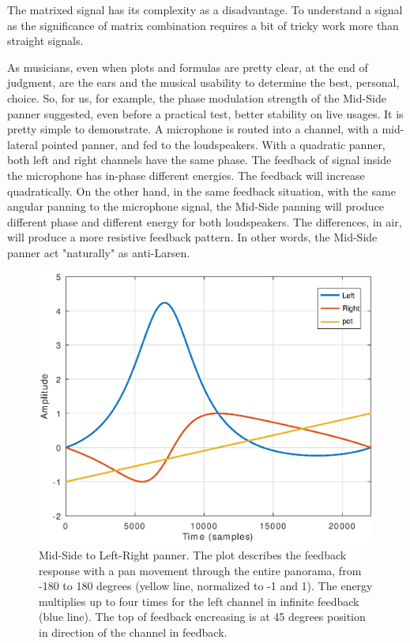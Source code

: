 \documentclass{article}
\begin{document}
The matrixed signal has its complexity as a disadvantage. To understand a signal as the significance of matrix combination requires a bit of tricky work more than straight signals. 

As musicians, even when plots and formulas are pretty clear, at the end of judgment, are the ears and the musical usability to determine the best, personal, choice. So, for us, for example, the phase modulation strength of the Mid-Side panner suggested, even before a practical test, better stability on live usages. It is pretty simple to demonstrate. A microphone is routed into a channel, with a mid-lateral pointed panner, and fed to the loudspeakers. With a quadratic panner, both left and right channels have the same phase. The feedback of signal inside the microphone has in-phase different energies. The feedback will increase quadratically. On the other hand, in the same feedback situation, with the same angular panning to the microphone signal, the Mid-Side panning will produce different phase and different energy for both loudspeakers. The differences, in air, will produce a more resistive feedback pattern. In other words, the Mid-Side panner act "naturally" as anti-Larsen.

\begin{figure}[h]
\centering
\includegraphics[width=1\columnwidth]{mspanlrfbpot}
\caption{Mid-Side to Left-Right panner. The plot describes the feedback response with a pan movement through the entire panorama, from -180 to 180 degrees (yellow line, normalized to -1 and 1). The energy multiplies up to four times for the left channel in infinite feedback (blue line). The top of feedback encreasing is at 45 degrees position in direction of the channel in feedback.}
\label{fig:mspanlrfb}
\end{figure}
\end{document}
